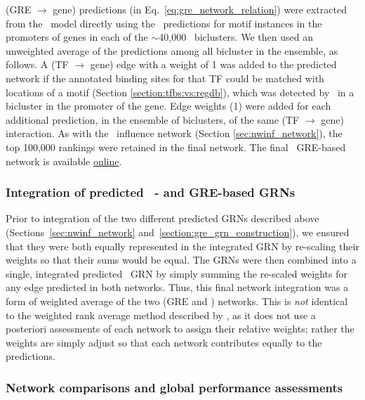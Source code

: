 (GRE $\rightarrow$ gene) predictions (in Eq.~\ref{eq:gre_network_relation}) were extracted from the \egrine\ model directly using the \MEME\ predictions for motif instances in the promoters of genes in each of the $\sim$40,000 \cm\ biclusters. We then used an unweighted average of the predictions among all bicluster in the ensemble, as follows. A (TF $\rightarrow$ gene) edge with a weight of 1 was added to the predicted network if the annotated binding sites for that TF could be matched with locations of a motif (Section \ref{section:tfbs:vs:regdb}), which was detected by \MEME\ in a bicluster in the promoter of the gene. Edge weights (1) were added for each additional prediction, in the ensemble of biclusters, of the same (TF $\rightarrow$ gene) interaction. As with the \nwinf~influence network (Section \ref{sec:nwinf_network}), the top 100,000 rankings were retained in the final network. The final \egrine~GRE-based network is available \href{http://egrin2.systemsbiology.net/}{online}. 

\subsubsection{Integration of predicted \egrine~\nwinf- and GRE-based GRNs}

Prior to integration of the two different predicted GRNs described above (Sections~\ref{sec:nwinf_network} and~\ref{section:gre_grn_construction}), we ensured that they were both equally represented in the integrated GRN by re-scaling their weights so that their sums would be equal. The GRNs were then combined into a single, integrated predicted \egrine\ GRN by simply summing the re-scaled weights for any edge predicted in both networks. Thus, this final network integration was a form of weighted average of the two (GRE and \nwinf) networks. This is {\it not} identical to the weighted rank average method described by \cite{marbach_wisdom_2012}, as it does not use a posteriori assessments of each network to assign their relative weights; rather the weights are simply adjust so that each network contributes equally to the predictions.

\subsubsection{Network comparisons and global performance assessments}
\label{sec:network_comparisons}

